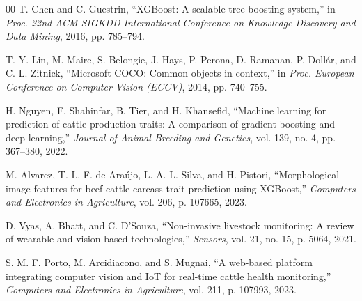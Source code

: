 \documentclass[conference]{IEEEtran}
\begin{document}
\begin{thebibliography}{00}
T. Chen and C. Guestrin,
``XGBoost: A scalable tree boosting system,''
in \textit{Proc. 22nd ACM SIGKDD International Conference on Knowledge Discovery and Data Mining},
2016, pp. 785--794.

T.-Y. Lin, M. Maire, S. Belongie, J. Hays, P. Perona, D. Ramanan,
P. Doll\'{a}r, and C. L. Zitnick,
``Microsoft COCO: Common objects in context,''
in \textit{Proc. European Conference on Computer Vision (ECCV)},
2014, pp. 740--755.

H. Nguyen, F. Shahinfar, B. Tier, and H. Khansefid,
``Machine learning for prediction of cattle production traits: A comparison of gradient boosting and deep learning,''
\textit{Journal of Animal Breeding and Genetics}, vol. 139, no. 4, pp. 367--380, 2022.

M. Alvarez, T. L. F. de Ara\'{u}jo, L. A. L. Silva, and H. Pistori,
``Morphological image features for beef cattle carcass trait prediction using XGBoost,''
\textit{Computers and Electronics in Agriculture}, vol. 206, p. 107665, 2023.

D. Vyas, A. Bhatt, and C. D'Souza,
``Non-invasive livestock monitoring: A review of wearable and vision-based technologies,''
\textit{Sensors}, vol. 21, no. 15, p. 5064, 2021.

S. M. F. Porto, M. Arcidiacono, and S. Mugnai,
``A web-based platform integrating computer vision and IoT for real-time cattle health monitoring,''
\textit{Computers and Electronics in Agriculture}, vol. 211, p. 107993, 2023.

\end{thebibliography}
\end{document}
